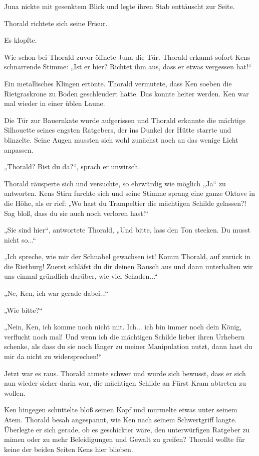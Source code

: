 Juna nickte mit gesenktem Blick und legte ihren Stab enttäuscht zur Seite.

Thorald richtete sich seine Frisur.

Es klopfte.

Wie schon bei Thorald zuvor öffnete Juna die Tür. Thorald erkannt sofort Kens schnarrende Stimme: „Ist er hier? Richtet ihm aus, dass er etwas vergessen hat!“

Ein metallisches Klingen ertönte. Thorald vermutete, dass Ken soeben die Rietgraskrone zu Boden geschleudert hatte. Das konnte heiter werden. Ken war mal wieder in einer üblen Laune.

Die Tür zur Bauernkate wurde aufgerissen und Thorald erkannte die mächtige Silhouette seines engsten Ratgebers, der ins Dunkel der Hütte starrte und blinzelte. Seine Augen mussten sich wohl zunächst noch an das wenige Licht anpassen.

„Thorald? Bist du da?“, sprach er unwirsch.

Thorald räusperte sich und versuchte, so ehrwürdig wie möglich „Ja“ zu antworten. Kens Stirn furchte sich und seine Stimme sprang eine ganze Oktave in die Höhe, als er rief: „Wo hast du Trampeltier die mächtigen Schilde gelassen?! Sag bloß, dass du sie auch noch verloren hast!“

„Sie sind hier“, antwortete Thorald, „Und bitte, lass den Ton stecken. Du musst nicht so...“

„Ich spreche, wie mir der Schnabel gewachsen ist! Komm Thorald, auf zurück in die Rietburg! Zuerst schläfst du dir deinen Rausch aus und dann unterhalten wir uns einmal gründlich darüber, wie viel Schaden...“

„Ne, Ken, ich war gerade dabei...“

„Wie bitte?“

„Nein, Ken, ich komme noch nicht mit. Ich... ich bin immer noch dein König, verflucht noch mal! Und wenn ich die mächtigen Schilde lieber ihren Urhebern schenke, als dass du sie noch länger zu meiner Manipulation nutzt, dann hast du mir da nicht zu widersprechen!“

Jetzt war es raus. Thorald atmete schwer und wurde sich bewusst, dass er sich nun wieder sicher darin war, die mächtigen Schilde an Fürst Kram abtreten zu wollen.

Ken hingegen schüttelte bloß seinen Kopf und murmelte etwas unter seinem Atem. Thorald besah angespannt, wie Ken nach seinem Schwertgriff langte. Überlegte er sich gerade, ob es geschickter wäre, den unterwürfigen Ratgeber zu mimen oder zu mehr Beleidigungen und Gewalt zu greifen? Thorald wollte für keine der beiden Seiten Kens hier blieben.

